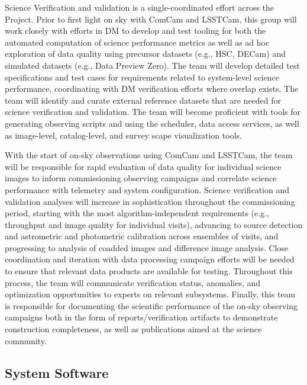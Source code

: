 \documentclass[SE,lsstdraft,authoryear,toc]{lsstdoc}
\begin{document}
Science Verification and validation is a single-coordinated effort across the Project.
Prior to first light on sky with ComCam and LSSTCam, this group will work closely with efforts in DM to develop and test tooling for both the automated computation of science performance metrics as well as ad hoc exploration of data quality using precursor datasets (e.g., HSC, DECam) and simulated datasets (e.g., Data Preview Zero).
The team will develop detailed test specifications and test cases for requirements related to system-level science performance, coordinating with DM verification efforts where overlap exists.
The team will identify and curate external reference datasets that are needed for science verification and validation.
The team will become proficient with tools for generating observing scripts and using the scheduler, data access services, as well as image-level, catalog-level, and survey scape visualization tools.

With the start of on-sky observations using ComCam and LSSTCam, the team will be responsible for rapid evaluation of data quality for individual science images to inform commissioning observing campaigns and correlate science performance with telemetry and system configuration.
Science verification and validation analyses will increase in sophistication throughout the commissioning period, starting with the most algorithm-independent requirements (e.g., throughput and image quality for individual visits), advancing to source detection and astrometric and photometric calibration across ensembles of visits, and progressing to analysis of coadded images and difference image analysis.
Close coordination and iteration with data processing campaign efforts will be needed to ensure that relevant data products are available for testing.
Throughout this process, the team will communicate verification status, anomalies, and optimization opportunities to experts on relevant subsystems.
Finally, this team is responsible for documenting the scientific performance of the on-sky observing campaigns both in the form of reports/verification artifacts to demonstrate construction completeness, as well as publications aimed at the science community.

\subsection{System Software}
\end{document}
